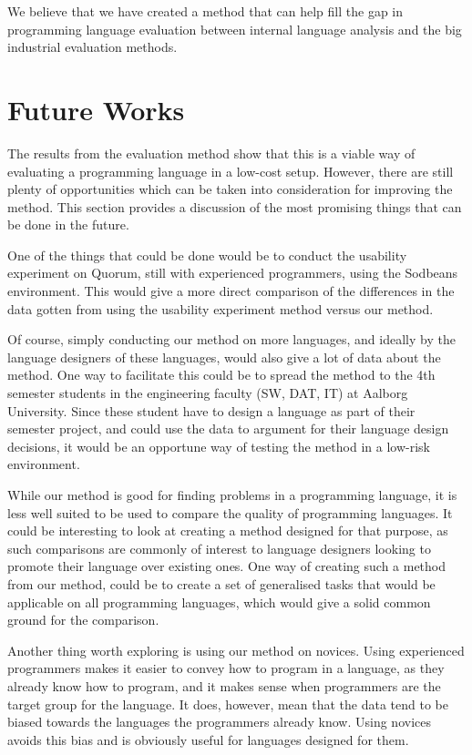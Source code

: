 \documentclass[preprint,10pt]{sigplanconf}
\begin{document}
We believe that we have created a method that can help fill the gap in programming language evaluation between internal language analysis and the big industrial evaluation methods.

\section{Future Works}
The results from the evaluation method show that this is a viable way of evaluating a programming language in a low-cost setup. However, there are still plenty of opportunities which can be taken into consideration for improving the method. This section provides a discussion of the most promising things that can be done in the future.

One of the things that could be done would be to conduct the usability experiment on Quorum, still with experienced programmers, using the Sodbeans environment. 
This would give a more direct comparison of the differences in the data gotten from using the usability experiment method versus our method.

Of course, simply conducting our method on more languages, and ideally by the language designers of these languages, would also give a lot of data about the method.
One way to facilitate this could be to spread the method to the 4th semester students in the engineering faculty (SW, DAT, IT) at Aalborg University.
Since these student have to design a language as part of their semester project, and could use the data to argument for their language design decisions, it would be an opportune way of testing the method in a low-risk environment.

While our method is good for finding problems in a programming language, it is less well suited to be used to compare the quality of programming languages.
It could be interesting to look at creating a method designed for that purpose, as such comparisons are commonly of interest to language designers looking to promote their language over existing ones.
One way of creating such a method from our method, could be to create a set of generalised tasks that would be applicable on all programming languages, which would give a solid common ground for the comparison.

Another thing worth exploring is using our method on novices.
Using experienced programmers makes it easier to convey how to program in a language, as they already know how to program, and it  makes sense when programmers are the target group for the language.
It does, however, mean that the data tend to be biased towards the languages the programmers already know.
Using novices avoids this bias and is obviously useful for languages designed for them.
\end{document}
